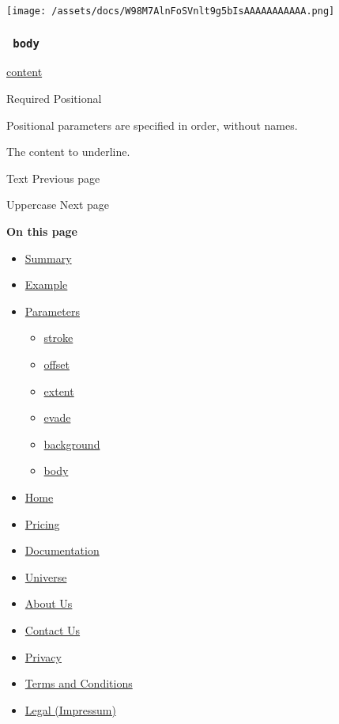 \texttt{[image: /assets/docs/W98M7AlnFoSVnlt9g5bIsAAAAAAAAAAA.png]}

\subsubsection{\texorpdfstring{\texttt{\ body\ }}{ body }}\label{parameters-body}

\href{/docs/reference/foundations/content/}{content}

{Required} {{ Positional }}

\label{parameters-body-positional-tooltip}
Positional parameters are specified in order, without names.

The content to underline.

\href{/docs/reference/text/text/}{\pandocbounded{}}

{ Text } { Previous page }

\href{/docs/reference/text/upper/}{\pandocbounded{}}

{ Uppercase } { Next page }

\textbf{On this page}

\begin{itemize}
\tightlist
\item
  \hyperref[summary]{Summary}
\item
  \hyperref[example]{Example}
\item
  \hyperref[parameters]{Parameters}

  \begin{itemize}
  \tightlist
  \item
    \hyperref[parameters-stroke]{stroke}
  \item
    \hyperref[parameters-offset]{offset}
  \item
    \hyperref[parameters-extent]{extent}
  \item
    \hyperref[parameters-evade]{evade}
  \item
    \hyperref[parameters-background]{background}
  \item
    \hyperref[parameters-body]{body}
  \end{itemize}
\end{itemize}

\begin{itemize}
\tightlist
\item
  \href{/}{Home}
\item
  \href{/pricing/}{Pricing}
\item
  \href{/docs/}{Documentation}
\item
  \href{/universe/}{Universe}
\item
  \href{/about/}{About Us}
\item
  \href{/contact/}{Contact Us}
\item
  \href{/privacy/}{Privacy}
\item
  \href{https://typst.app/terms}{Terms and Conditions}
\item
  \href{/legal/}{Legal (Impressum)}
\end{itemize}

